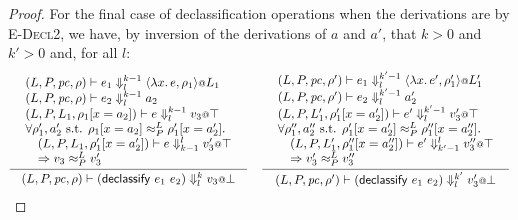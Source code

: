 \documentclass{article}
\makeatletter
\theoremstyle{definition}
\newcommand{\at}{\ensuremath{{\scriptstyle{@}}}}
\newcommand{\pc}{\ensuremath{{\mathit{pc}}}}
\makeatother
\begin{document}
\begin{proof}
  For the final case of declassification operations when the derivations
  are by \textsc{E-Decl2}, we have, by inversion of the derivations of $a$
  and $a'$, that $k > 0$ and $k' > 0$ and, for all $l$:
  \begin{gather*}
    \inference{
      {\begin{array}{l}
          (L, P, \pc, \rho) |-
          e_1
          \Downarrow^{k-1}_{l}
          \langle{\lambda{x}.\, e, \rho_1\rangle} \at L_1
          \\
          (L, P, \pc, \rho) |-
          e_2
          \Downarrow^{k-1}_{l}
          a_2
          \\
          (L, P, L_1, \rho_1[x = a_2]) |-
          e
          \Downarrow^{k-1}_{l}
          v_3 \at \top
          \\
          \forall{\rho_1', a_2' \text{ s.t. }
            \rho_1[x = a_2] \approx^{L}_{P} \rho_1'[x = a_2']}.
          \\\quad
          (L, P, L_1, \rho_1'[x = a_2']) |-
          e
          \Downarrow^{l}_{k-1}
          v_3' \at \top
          \\\quad =>
          v_3 \approx^{L}_{P} v_3'
        \end{array}}
    }{
      (L, P, \pc, \rho) |-
      (\mathsf{declassify}\ e_1\ e_2)
      \Downarrow^{k}_{l}
      v_3 \at \bot
    }
    \quad
    \inference{
      {\begin{array}{l}
          (L, P, \pc, \rho') |-
          e_1
          \Downarrow^{k'-1}_{l}
          \langle{\lambda{x}.\, e', \rho_1'\rangle} \at L_1'
          \\
          (L, P, \pc, \rho') |-
          e_2
          \Downarrow^{k'-1}_{l}
          a_2'
          \\
          (L, P, L_1', \rho_1'[x = a_2']) |-
          e'
          \Downarrow^{k'-1}_{l}
          v_3' \at \top
          \\
          \forall{\rho_1'', a_2'' \text{ s.t. }
            \rho_1'[x = a_2'] \approx^{L}_{P} \rho_1''[x = a_2'']}.
          \\\quad
          (L, P, L_1', \rho_1''[x = a_2'']) |-
          e'
          \Downarrow^{l}_{k'-1}
          v_3'' \at \top
          \\\quad =>
          v_3' \approx^{L}_{P} v_3''
        \end{array}}
    }{
      (L, P, \pc, \rho') |-
      (\mathsf{declassify}\ e_1\ e_2)
      \Downarrow^{k'}_{l}
      v_3' \at \bot
    }
  \end{gather*}


\end{proof}
\end{document}
